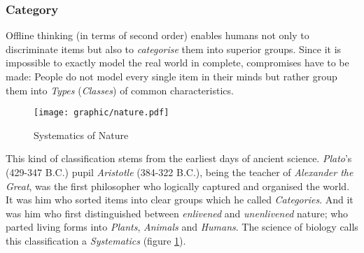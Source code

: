 %
%
%
%
%
%
%

\subsubsection{Category}
\label{category_heading}

Offline thinking (in terms of second order) enables humans not only to
discriminate items but also to \emph{categorise} them into superior groups.
Since it is impossible to exactly model the real world in complete, compromises
have to be made: People do not model every single item in their minds but rather
group them into \emph{Types} (\emph{Classes}) of common characteristics.

\begin{figure}[ht]
    \begin{center}
        \texttt{[image: graphic/nature.pdf]}
        \caption{Systematics of Nature}
        \label{nature_figure}
    \end{center}
\end{figure}

This kind of classification stems from the earliest days of ancient science.
\emph{Plato}'s (429-347 B.C.) pupil \emph{Aristotle} (384-322 B.C.), being the
teacher of \emph{Alexander the Great}, was the first philosopher who logically
captured and organised the world. It was him who sorted items into clear groups
which he called \emph{Categories}. And it was him who first distinguished
between \emph{enlivened} and \emph{unenlivened} nature; who parted living forms
into \emph{Plants}, \emph{Animals} and \emph{Humans}. The science of biology
calls this classification a \emph{Systematics} (figure \ref{nature_figure}).

